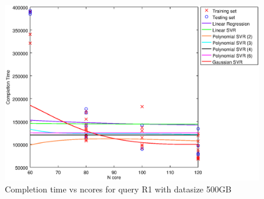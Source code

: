 
\begin {figure}[hbtp]
\centering
\includegraphics[width=\textwidth]{output/R1_500_1_OVER_NCORES/plot_R1_500.eps}
\caption{Completion time vs ncores for query R1 with datasize 500GB}
\label{fig:all_nonlinear_R1_500}
\end {figure}
